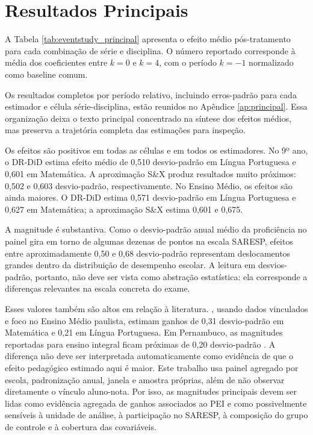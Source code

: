 \section{Resultados Principais} \label{sec:resultadosprincipais}

A Tabela \ref{tab:eventstudy_principal} apresenta o efeito médio pós-tratamento para cada combinação de série e disciplina. O número reportado corresponde à média dos coeficientes entre $k=0$ e $k=4$, com o período $k=-1$ normalizado como baseline comum.



Os resultados completos por período relativo, incluindo erros-padrão para cada estimador e célula série-disciplina, estão reunidos no Apêndice \ref{ap:principal}. Essa organização deixa o texto principal concentrado na síntese dos efeitos médios, mas preserva a trajetória completa das estimações para inspeção.

Os efeitos são positivos em todas as células e em todos os estimadores. No 9º ano, o DR-DiD estima efeito médio de 0,510 desvio-padrão em Língua Portuguesa e 0,601 em Matemática. A aproximação S\&X produz resultados muito próximos: 0,502 e 0,603 desvio-padrão, respectivamente. No Ensino Médio, os efeitos são ainda maiores. O DR-DiD estima 0,571 desvio-padrão em Língua Portuguesa e 0,627 em Matemática; a aproximação S\&X estima 0,601 e 0,675.

A magnitude é substantiva. Como o desvio-padrão anual médio da proficiência no painel gira em torno de algumas dezenas de pontos na escala SARESP, efeitos entre aproximadamente 0,50 e 0,68 desvio-padrão representam deslocamentos grandes dentro da distribuição de desempenho escolar. A leitura em desvios-padrão, portanto, não deve ser vista como abstração estatística: ela corresponde a diferenças relevantes na escala concreta do exame.

Esses valores também são altos em relação à literatura. \textcite{scorzafave2023}, usando dados vinculados e foco no Ensino Médio paulista, estimam ganhos de 0,31 desvio-padrão em Matemática e 0,21 em Língua Portuguesa. Em Pernambuco, as magnitudes reportadas para ensino integral ficam próximas de 0,20 desvio-padrão \cite{Pernambuco}. A diferença não deve ser interpretada automaticamente como evidência de que o efeito pedagógico estimado aqui é maior. Este trabalho usa painel agregado por escola, padronização anual, janela e amostra próprias, além de não observar diretamente o vínculo aluno-nota. Por isso, as magnitudes principais devem ser lidas como evidência agregada de ganhos associados ao PEI e como possivelmente sensíveis à unidade de análise, à participação no SARESP, à composição do grupo de controle e à cobertura das covariáveis.

